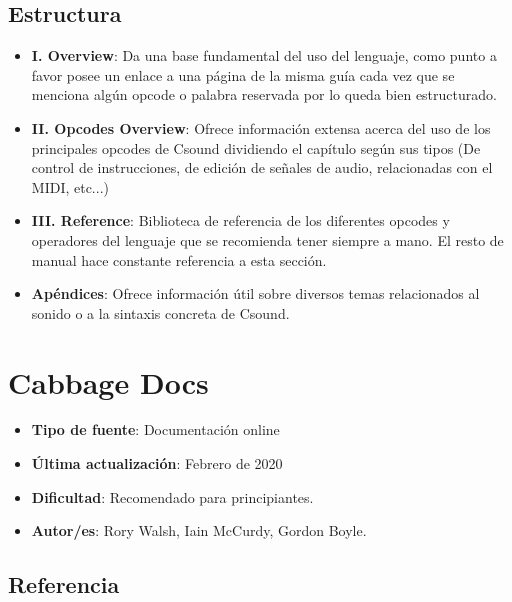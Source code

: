 \subsection{Estructura}

 \begin{itemize}
 \item \textbf{I. Overview}: Da una base fundamental del uso del lenguaje, como punto a favor posee un enlace a una página de la misma guía cada vez que se menciona algún opcode o palabra reservada por lo queda bien estructurado.
 
 \item \textbf{II. Opcodes Overview}: Ofrece información extensa acerca del uso de los principales opcodes de Csound dividiendo el capítulo según sus tipos (De control de instrucciones, de edición de señales de audio, relacionadas con el MIDI, etc...)
 
 \item \textbf{III. Reference}: Biblioteca de referencia de los diferentes opcodes y operadores del lenguaje que se recomienda tener siempre a mano. El resto de manual hace constante referencia a esta sección.
 
 \item \textbf{Apéndices}: Ofrece información útil sobre diversos temas relacionados al sonido o a la sintaxis concreta de Csound.
 \end{itemize}

\section{Cabbage Docs}

 \begin{itemize}
 \item \textbf{Tipo de fuente}: Documentación online
 
 \item \textbf{Última actualización}: Febrero de 2020
 
 \item \textbf{Dificultad}: Recomendado para principiantes.
 
 \item \textbf{Autor/es}: Rory Walsh, Iain McCurdy, Gordon Boyle.
 \end{itemize}

\subsection{Referencia}

